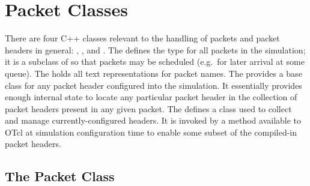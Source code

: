 \section{Packet Classes}
\label{sec:packetclasses}

There are four C++ classes relevant to the handling of packets
and packet headers in general: , 
, and .
The 
defines the type for all packets in the simulation;
it is a subclass of  so that packets may
be scheduled (e.g.~for later arrival at some queue).
The  holds all text
representations for packet names.
The  provides a base class for
any packet header configured into the simulation.
It essentially provides 
enough internal state to locate any particular packet
header in the collection of packet headers present in any given packet.
The 
defines a class used to collect and manage currently-configured headers.
It is invoked by a method available to OTcl at simulation configuration
time to enable some subset of the compiled-in packet headers.

\subsection{The Packet Class}
\label{sec:packetclass}

